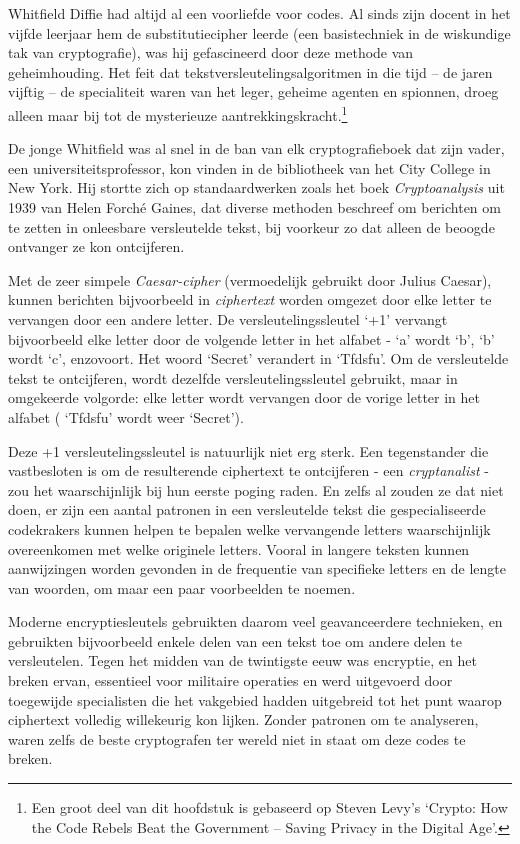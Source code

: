 \documentclass[smalldemyvopaper,11pt,twoside,onecolumn,openright,extrafontsizes,hidelinks]{memoir}
\begin{document}
Whitfield Diffie had altijd al een voorliefde voor codes. Al sinds zijn
docent in het vijfde leerjaar hem de substitutiecipher leerde (een
basistechniek in de wiskundige tak van cryptografie), was hij
gefascineerd door deze methode van geheimhouding. Het feit dat
tekstversleutelingsalgoritmen in die tijd -- de jaren vijftig -- de
specialiteit waren van het leger, geheime agenten en spionnen, droeg
alleen maar bij tot de mysterieuze aantrekkingskracht.\footnote{Een
  groot deel van dit hoofdstuk is gebaseerd op Steven Levy's `Crypto:
  How the Code Rebels Beat the Government -- Saving Privacy in the
  Digital Age'.}

De jonge Whitfield was al snel in de ban van elk cryptografieboek dat
zijn vader, een universiteitsprofessor, kon vinden in de bibliotheek van
het City College in New York. Hij stortte zich op standaardwerken zoals
het boek \emph{Cryptoanalysis} uit 1939 van Helen Forché Gaines, dat
diverse methoden beschreef om berichten om te zetten in onleesbare
versleutelde tekst, bij voorkeur zo dat alleen de beoogde ontvanger ze
kon ontcijferen.

Met de zeer simpele \emph{Caesar-cipher} (vermoedelijk gebruikt door
Julius Caesar), kunnen berichten bijvoorbeeld in \emph{ciphertext}
worden omgezet door elke letter te vervangen door een andere letter. De
versleutelingssleutel `+1' vervangt bijvoorbeeld elke letter door de
volgende letter in het alfabet - `a' wordt `b', `b' wordt `c',
enzovoort. Het woord `Secret' verandert in `Tfdsfu'. Om de versleutelde
tekst te ontcijferen, wordt dezelfde versleutelingssleutel gebruikt,
maar in omgekeerde volgorde: elke letter wordt vervangen door de vorige
letter in het alfabet ( `Tfdsfu' wordt weer `Secret').

Deze +1 versleutelingssleutel is natuurlijk niet erg sterk. Een
tegenstander die vastbesloten is om de resulterende ciphertext te
ontcijferen - een \emph{cryptanalist} - zou het waarschijnlijk bij hun
eerste poging raden. En zelfs al zouden ze dat niet doen, er zijn een
aantal patronen in een versleutelde tekst die gespecialiseerde
codekrakers kunnen helpen te bepalen welke vervangende letters
waarschijnlijk overeenkomen met welke originele letters. Vooral in
langere teksten kunnen aanwijzingen worden gevonden in de frequentie van
specifieke letters en de lengte van woorden, om maar een paar
voorbeelden te noemen.

Moderne encryptiesleutels gebruikten daarom veel geavanceerdere
technieken, en gebruikten bijvoorbeeld enkele delen van een tekst toe om
andere delen te versleutelen. Tegen het midden van de twintigste eeuw
was encryptie, en het breken ervan, essentieel voor militaire operaties
en werd uitgevoerd door toegewijde specialisten die het vakgebied hadden
uitgebreid tot het punt waarop ciphertext volledig willekeurig kon
lijken. Zonder patronen om te analyseren, waren zelfs de beste
cryptografen ter wereld niet in staat om deze codes te breken.
\end{document}
